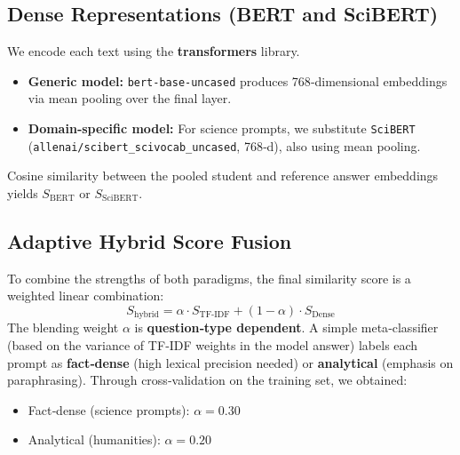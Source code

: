 \documentclass[11pt,a4paper]{article}
\begin{document}
\subsection{Dense Representations (BERT and SciBERT)}
\label{sec:dense}
We encode each text using the \textbf{transformers} library.
\begin{itemize}[noitemsep]
\item \textbf{Generic model:} \texttt{bert-base-uncased} produces 768‑dimensional embeddings via mean pooling over the final layer.
\item \textbf{Domain‑specific model:} For science prompts, we substitute \texttt{SciBERT} (\texttt{allenai/scibert\_scivocab\_uncased}, 768‑d), also using mean pooling.
\end{itemize}
Cosine similarity between the pooled student and reference answer embeddings yields $S_{\text{BERT}}$ or $S_{\text{SciBERT}}$.

\subsection{Adaptive Hybrid Score Fusion}
\label{sec:hybrid}
To combine the strengths of both paradigms, the final similarity score is a weighted linear combination:
\[
S_{\text{hybrid}} = \alpha \cdot S_{\text{TF‑IDF}} + (1 - \alpha) \cdot S_{\text{Dense}}
\]
The blending weight $\alpha$ is \textbf{question‑type dependent}. A simple meta‑classifier (based on the variance of TF‑IDF weights in the model answer) labels each prompt as \textbf{fact‑dense} (high lexical precision needed) or \textbf{analytical} (emphasis on paraphrasing). Through cross‑validation on the training set, we obtained:
\begin{itemize}[noitemsep]
\item Fact‑dense (science prompts): $\alpha = 0.30$
\item Analytical (humanities): $\alpha = 0.20$
\end{itemize}
\end{document}
